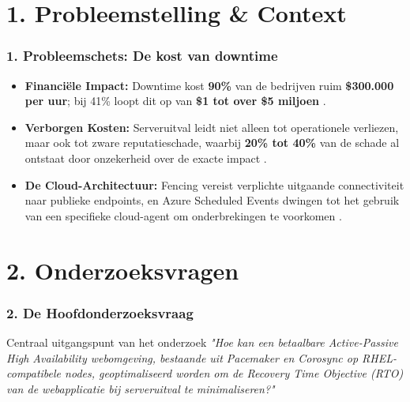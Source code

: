 \documentclass[aspectratio=169]{beamer}
\begin{document}
    
    \section{1. Probleemstelling \& Context}
    
    \begin{frame}
        \frametitle{1. Probleemschets: De kost van downtime}
            \begin{itemize}
                \setlength{\itemsep}{0.4em}
                \item \textbf{Financiële Impact:} Downtime kost \textbf{90\%} van de bedrijven ruim \textbf{\$300.000 per uur}; bij 41\% loopt dit op van \textbf{\$1 tot over \$5 miljoen} \parencite{ITIC2024}.
                \item \textbf{Verborgen Kosten:} Serveruitval leidt niet alleen tot operationele verliezen, maar ook tot zware reputatieschade, waarbij \textbf{20\% tot 40\%} van de schade al ontstaat door onzekerheid over de exacte impact \parencite{Kollective2025}.
                \item \textbf{De Cloud-Architectuur:} Fencing vereist verplichte uitgaande connectiviteit naar publieke endpoints, en Azure Scheduled Events dwingen tot het gebruik van een specifieke cloud-agent om onderbrekingen te voorkomen \parencite{Microsoft2026}.
            \end{itemize}
    \end{frame}
    
    
    \section{2. Onderzoeksvragen}
    
    \begin{frame}
        \frametitle{2. De Hoofdonderzoeksvraag}
        \vspace{0.5cm}
        \begin{alertblock}{Centraal uitgangspunt van het onderzoek}
            \large\centering\itshape
            "Hoe kan een betaalbare Active-Passive High Availability webomgeving, bestaande uit Pacemaker en Corosync op RHEL-compatibele nodes, geoptimaliseerd worden om de Recovery Time Objective (RTO) van de webapplicatie bij serveruitval te minimaliseren?"
        \end{alertblock}
    \end{frame}
    
\end{document}
